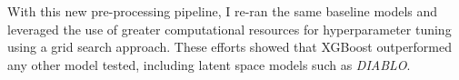 

With this new pre-processing pipeline, I re-ran the same baseline models and
leveraged the use of greater computational resources for hyperparameter tuning
using a grid search approach. These efforts showed that XGBoost outperformed
any other model tested, including latent space models such as \textit{DIABLO}.

